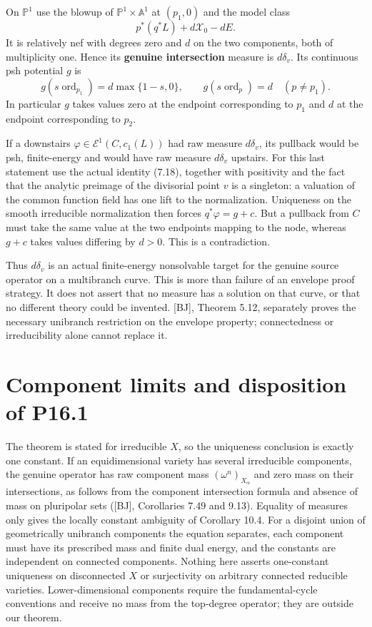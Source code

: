 \documentclass[11pt]{article}
\begin{document}
On \(\mathbb P^1\) use the blowup of \(\mathbb P^1\times\mathbb A^1\) at
\((p_1,0)\) and the model class \[p^*(q^*L)+d\mathcal X_0-dE.\] It is
relatively nef with degrees zero and \(d\) on the two components, both
of multiplicity one. Hence its \textbf{genuine intersection} measure is
\(d\delta_v\). Its continuous psh potential \(g\) is
\[g(s\operatorname{ord}_{p_1})=d\max\{1-s,0\},\qquad
g(s\operatorname{ord}_p)=d\quad(p\ne p_1).\] In particular \(g\) takes
values zero at the endpoint corresponding to \(p_1\) and \(d\) at the
endpoint corresponding to \(p_2\).

If a downstairs \(\varphi\in\mathcal E^1(C,c_1(L))\) had raw measure
\(d\delta_v\), its pullback would be psh, finite-energy and would have
raw measure \(d\delta_v\) upstairs. For this last statement use the
actual identity (7.18), together with positivity and the fact that the
analytic preimage of the divisorial point \(v\) is a singleton: a
valuation of the common function field has one lift to the
normalization. Uniqueness on the smooth irreducible normalization then
forces \(q^*\varphi=g+c\). But a pullback from \(C\) must take the same
value at the two endpoints mapping to the node, whereas \(g+c\) takes
values differing by \(d>0\). This is a contradiction.

Thus \(d\delta_v\) is an actual finite-energy nonsolvable target for the
genuine source operator on a multibranch curve. This is more than
failure of an envelope proof strategy. It does not assert that no
measure has a solution on that curve, or that no different theory could
be invented. {[}BJ{]}, Theorem 5.12, separately proves the necessary
unibranch restriction on the envelope property; connectedness or
irreducibility alone cannot replace it.

\section{Component limits and disposition of
P16.1}\label{component-limits-and-disposition-of-p16.1}

The theorem is stated for irreducible \(X\), so the uniqueness
conclusion is exactly one constant. If an equidimensional variety has
several irreducible components, the genuine operator has raw component
mass \((\omega^n)_{X_\alpha}\) and zero mass on their intersections, as
follows from the component intersection formula and absence of mass on
pluripolar sets ({[}BJ{]}, Corollaries 7.49 and 9.13). Equality of
measures only gives the locally constant ambiguity of Corollary 10.4.
For a disjoint union of geometrically unibranch components the equation
separates, each component must have its prescribed mass and finite dual
energy, and the constants are independent on connected components.
Nothing here asserts one-constant uniqueness on disconnected \(X\) or
surjectivity on arbitrary connected reducible varieties.
Lower-dimensional components require the fundamental-cycle conventions
and receive no mass from the top-degree operator; they are outside our
theorem.
\end{document}
